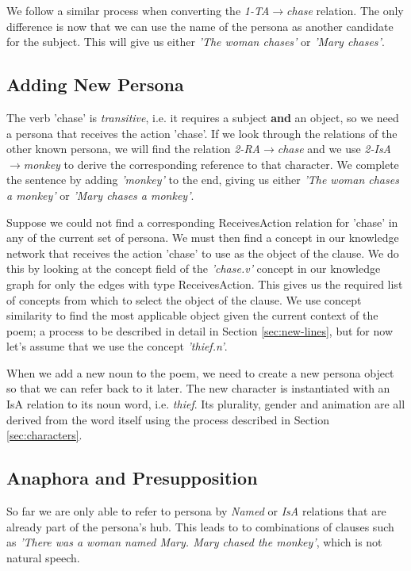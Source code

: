 We follow a similar process when converting the \textit{1-TA$\rightarrow$chase} relation. The only difference is now that we can use the name of the persona as another candidate for the subject. This will give us either \textit{'The woman chases'} or \textit{'Mary chases'}.

\subsection{Adding New Persona}
The verb 'chase' is \textit{transitive}, i.e. it requires a subject \textbf{and} an object, so we need a persona that receives the action 'chase'. If we look through the relations of the other known persona, we will find the relation \textit{2-RA$\rightarrow$chase} and we use \textit{2-IsA$\rightarrow$monkey} to derive the corresponding reference to that character. We complete the sentence by adding \textit{'monkey'} to the end, giving us either \textit{'The woman chases a monkey'} or \textit{'Mary chases a monkey'}.

Suppose we could not find a corresponding ReceivesAction relation for 'chase' in any of the current set of persona. We must then find a concept in our knowledge network that receives the action 'chase' to use as the object of the clause. We do this by looking at the concept field of the \textit{'chase.v'} concept in our knowledge graph for only the edges with type ReceivesAction. This gives us the required list of concepts from which to select the object of the clause. We use concept similarity to find the most applicable object given the current context of the poem; a process to be described in detail in Section \ref{sec:new-lines}, but for now let's assume that we use the concept \textit{'thief.n'}.

When we add a new noun to the poem, we need to create a new persona object so that we can refer back to it later. The new character is instantiated with an IsA relation to its noun word, i.e. \textit{thief}. Its plurality, gender and animation are all derived from the word itself using the process described in Section \ref{sec:characters}.

\subsection{Anaphora and Presupposition}
So far we are only able to refer to persona by \textit{Named} or \textit{IsA} relations that are already part of the persona's hub. This leads to to combinations of clauses such as \textit{'There was a woman named Mary. Mary chased the monkey'}, which is not natural speech.

